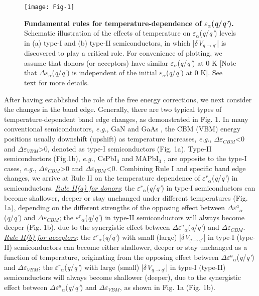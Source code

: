 \documentclass[onecolumn,preprint,superscriptaddress]{revtex4-1}
\begin{document}
\begin{figure}[htb!]
\texttt{[image: Fig-1]}
\caption{\label{fig:structure} \textbf{Fundamental rules for temperature-dependence of $\varepsilon$$_{\alpha}$(\emph{q}/\emph{q'}).} Schematic illustration of the effects of temperature on $\varepsilon$$_{\alpha}$(\emph{q}/\emph{q'}) levels in (a) type-I and (b) type-II semiconductors, in which |$\delta$\emph{V}$_{q\rightarrow q'}$| is discovered to play a critical role. For convenience of plotting, we assume that donors (or acceptors) have similar $\varepsilon$$_{\alpha}$(\emph{q}/\emph{q'}) at 0 K [Note that $\Delta$$\varepsilon$$_{\alpha}$(\emph{q}/\emph{q'}) is independent of the initial $\varepsilon$$_{\alpha}$(\emph{q}/\emph{q'}) at 0 K]. See text for more details.}
\label{1}
\end{figure}

After having established the role of the free energy corrections, we next consider the changes in the band edge. Generally, there are two typical types of temperature-dependent band edge changes, as demonstrated in Fig. 1. In many conventional semiconductors, \emph{e.g.}, GaN \cite{33,34} and GaAs \cite{35}, the CBM (VBM) energy positions usually downshift (upshift) as temperature increases, \emph{e.g.}, $\Delta$$\varepsilon$$_{CBM}$<0 and $\Delta$$\varepsilon$$_{VBM}$>0, denoted as type-I semiconductors (Fig. 1a). Type-II semiconductors (Fig.1b), \emph{e.g.}, CsPbI$_3$ \cite{36} and MAPbI$_3$ \cite{37,38}, are opposite to the type-I cases, \emph{e.g.}, $\Delta$$\varepsilon$$_{CBM}$>0 and $\Delta$$\varepsilon$$_{VBM}$<0. Combining Rule I and specific band edge changes, we arrive at Rule II on the temperature dependence of $\varepsilon$$^{r}$$_{\alpha}$(\emph{q}/\emph{q'}) in semiconductors. \underline{\emph{Rule II(a) for donors}}: the $\varepsilon$$^{r}$$_{\alpha}$(\emph{q}/\emph{q'}) in type-I semiconductors can become shallower, deeper or stay unchanged under different temperatures (Fig. 1a), depending on the different strengths of the opposing effect between $\Delta$$\varepsilon$$^{a}$$_{\alpha}$(\emph{q}/\emph{q'}) and $\Delta$$\varepsilon$$_{CBM}$; the $\varepsilon$$^{r}$$_{\alpha}$(\emph{q}/\emph{q'}) in type-II semiconductors will always become deeper (Fig. 1b), due to the synergistic effect between $\Delta$$\varepsilon$$^{a}$$_{\alpha}$(\emph{q}/\emph{q'}) and $\Delta$$\varepsilon$$_{CBM}$. \underline{\emph{Rule II(b) for acceptors}}: the $\varepsilon$$^{r}$$_{\alpha}$(\emph{q}/\emph{q'}) with small (large) |$\delta$\emph{V}$_{q\rightarrow q'}$| in type-I (type-II) semiconductors can become either shallower, deeper or stay unchanged as a function of temperature, originating from the opposing effect between $\Delta$$\varepsilon$$^{a}$$_{\alpha}$(\emph{q}/\emph{q'}) and $\Delta$$\varepsilon$$_{VBM}$; the $\varepsilon$$^{r}$$_{\alpha}$(\emph{q}/\emph{q'}) with large (small) |$\delta$\emph{V}$_{q\rightarrow q'}$| in type-I (type-II) semiconductors will always become shallower (deeper), due to the synergistic effect between $\Delta$$\varepsilon$$^{a}$$_{\alpha}$(\emph{q}/\emph{q'}) and $\Delta$$\varepsilon$$_{VBM}$, as shown in Fig. 1a (Fig. 1b).
\end{document}
